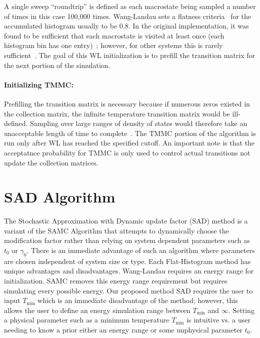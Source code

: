 \documentclass[letterpaper,twocolumn,amsmath,amssymb,pre,aps,10pt]{revtex4-1}
\begin{document}
A single sweep ``roundtrip'' is defined as each macrostate being
sampled a number of times in this case 100,000 times. Wang-Landau sets
a flatness criteria~\cite{wang2001determining, wang2001efficient,
hatch2015computational, mahynski2017predicting} for the accumulated
histogram usually to be 0.8.  In the original implementation, it was
found to be sufficient that each macrostate is visited at least once
(each histogram bin has one entry)~\cite{shell2003improved}; however,
for other systems this is rarely sufficient~\cite{bhar2009computer}.
The goal of this WL initialization is to prefill the transition matrix
for the next portion of the simulation.

\paragraph{Initializing TMMC:} Prefilling the transition matrix is
necessary because if numerous zeros existed in the collection matrix,
the infinite temperature transition matrix would be ill-defined.
Sampling over large ranges of density of states would therefore take an
unacceptable length of time to complete~\cite{shell2003improved,
shen2014elucidating}.  The TMMC portion of the algorithm is run only
after WL has reached the specified cutoff. An important note is that
the acceptatnce probability for TMMC is only used to control actual
transitions not update the collection matrices.

\section{SAD Algorithm}\label{sec:sad}
The Stochastic Approximation with Dynamic update factor (SAD) method
is a variant of the SAMC
Algorithm that attempts to dynamically choose the modification factor
rather than relying on system dependent parameters such as $t_0$ or
$\gamma_0$.  There is an immediate advantage of such an algorithm where
parameters are chosen independent of system size or type. Each
Flat-Histogram method has unique advantages and disadvantages.
Wang-Landau requires an energy range for initialization.  SAMC removes
this energy range requirement but requires simulating every possible
energy. Our proposed method SAD requires the user to input
$T_\text{min}$ which is an immediate disadvantage of the method;
however, this allows the user to define an energy simulation
range between $T_\text{min}$ and $\infty$. Setting a physical parameter
such as a minimum temperature $T_\text{min}$ is intuitive vs. a user
needing to know a prior either an energy range or some unphysical
parameter $t_0$.
\end{document}

